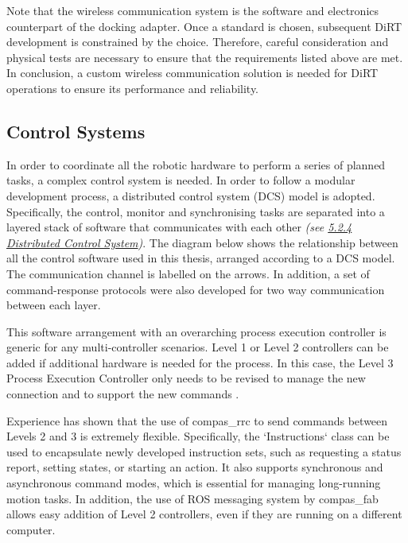 Note that the wireless communication system is the software and electronics counterpart of the docking adapter. Once a standard is chosen, subsequent DiRT development is constrained by the choice. Therefore, careful consideration and physical tests are necessary to ensure that the requirements listed above are met. In conclusion, a custom wireless communication solution is needed for DiRT operations to ensure its performance and reliability.

\subsection{Control Systems}
\label{subsection:discussion-control-systems}

In order to coordinate all the robotic hardware to perform a series of planned tasks, a complex control system is needed. In order to follow a modular development process, a distributed control system (DCS) model is adopted. Specifically, the control, monitor and synchronising tasks are separated into a layered stack of software that communicates with each other \textit{(see \ul{5.2.4 Distributed Control System})}. The diagram below shows the relationship between all the control software used in this thesis, arranged according to a DCS model. The communication channel is labelled on the arrows. In addition, a set of command-response protocols were also developed for two way communication between each layer. 



This software arrangement with an overarching process execution controller is generic for any multi-controller scenarios. Level 1 or Level 2 controllers can be added if additional hardware is needed for the process. In this case, the Level 3 Process Execution Controller only needs to be revised to manage the new connection and to support the new commands . 

Experience has shown that the use of compas\_rrc \parencite{fleischmannCOMPASRRCOnline2020} to send commands between Levels 2 and 3 is extremely flexible. Specifically, the `Instructions` class can be used to encapsulate newly developed instruction sets, such as requesting a status report, setting states, or starting an action. It also supports synchronous and asynchronous command modes, which is essential for managing long-running motion tasks. In addition, the use of ROS messaging system by compas\_fab allows easy addition of Level 2 controllers, even if they are running on a different computer. 


